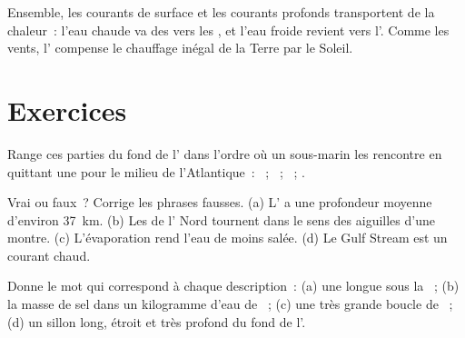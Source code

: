 Ensemble, les courants de surface et les courants profonds transportent de
la chaleur~: l'eau chaude va des  vers les , et l'eau froide
revient vers l'. Comme les vents, l' compense le chauffage
inégal de la Terre par le Soleil.

\section{Exercices}

\begin{exercise}[$\star$]\label{exo:g8:the-oceans:1}
Range ces parties du fond de l' dans l'ordre où un sous-marin les
rencontre en quittant une  pour le milieu de l'Atlantique~: ~; ~; ~; .
\end{exercise}

\begin{exercise}[$\star$]\label{exo:g8:the-oceans:2}
Vrai ou faux~? Corrige les phrases fausses. (a) L' a une profondeur
moyenne d'environ \qty{37}{km}. (b) Les  de l' Nord tournent
dans le sens des aiguilles d'une montre. (c) L'évaporation rend l'eau de
 moins salée. (d) Le Gulf Stream est un courant chaud.
\end{exercise}

\begin{exercise}[$\star$]\label{exo:g8:the-oceans:3}
Donne le mot qui correspond à chaque description~: (a) une longue  sous la ~; (b) la masse de sel dans un kilogramme d'eau de
~; (c) une très grande boucle de ~; (d) un sillon
long, étroit et très profond du fond de l'.
\end{exercise}

